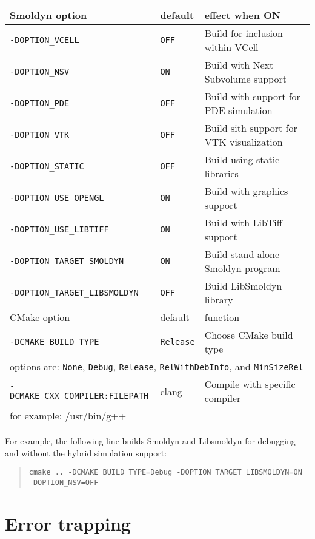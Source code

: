 \documentclass {book}
\begin{document}
\begin{longtable}[c]{lll}
Smoldyn option & default & effect when ON\\
\hline
\texttt{-DOPTION\_VCELL} & \texttt{OFF} & Build for inclusion within VCell\\
\texttt{-DOPTION\_NSV} & \texttt{ON} & Build with Next Subvolume support\\
\texttt{-DOPTION\_PDE} & \texttt{OFF} & Build with support for PDE simulation\\
\texttt{-DOPTION\_VTK} & \texttt{OFF} & Build sith support for VTK visualization\\
\texttt{-DOPTION\_STATIC} & \texttt{OFF} & Build using static libraries\\
\texttt{-DOPTION\_USE\_OPENGL} & \texttt{ON} & Build with graphics support\\
\texttt{-DOPTION\_USE\_LIBTIFF} & \texttt{ON} & Build with LibTiff support\\
\texttt{-DOPTION\_TARGET\_SMOLDYN} & \texttt{ON} & Build stand-alone Smoldyn program\\
\texttt{-DOPTION\_TARGET\_LIBSMOLDYN} & \texttt{OFF} & Build LibSmoldyn library\\
\hline
CMake option & default & function\\
\hline
\texttt{-DCMAKE\_BUILD\_TYPE} & \texttt{Release} & Choose CMake build type\\
\multicolumn{3}{l}{\hspace{0.3in}options are: \texttt{None}, \texttt{Debug}, \texttt{Release}, \texttt{RelWithDebInfo}, and \texttt{MinSizeRel}}\\
\texttt{-DCMAKE\_CXX\_COMPILER:FILEPATH} & clang & Compile with specific compiler\\
\multicolumn{3}{l}{\hspace{0.3in}for example: /usr/bin/g++}\\
\end{longtable}

For example, the following line builds Smoldyn and Libsmoldyn for debugging and without the hybrid simulation support:

\begin{quote}
\lstinline{cmake .. -DCMAKE_BUILD_TYPE=Debug -DOPTION_TARGET_LIBSMOLDYN=ON -DOPTION_NSV=OFF}
\end{quote}

\chapter{Error trapping}
\end{document}
